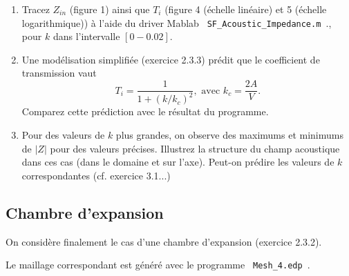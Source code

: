 \documentclass[11pt,a4paper]{article}
\begin{document}
\begin{enumerate}
\item 
Tracez $Z_{in}$ (figure 1) ainsi que $T_i$ (figure 4 (échelle linéaire) et 5 (échelle logarithmique))  à l'aide du driver Mablab 
\verb| SF_Acoustic_Impedance.m |., pour $k$ dans l'intervalle $[0-0.02]$.

\item Une modélisation simplifiée (exercice 2.3.3) prédit que le coefficient de transmission vaut 
$$
T_i  = \frac{1}{1+(k/k_c)^2}, \mbox{ avec } k_c = \frac{2 A}{V}.
$$
Comparez cette prédiction avec le résultat du programme.

\item Pour des valeurs de $k$ plus grandes, on observe des maximums et minimums de $|Z|$ pour des valeurs précises. Illustrez la structure du champ acoustique dans ces cas (dans le domaine et sur l'axe). Peut-on prédire les valeurs de $k$ correspondantes (cf. exercice 3.1...)






\end{enumerate}



\subsection{Chambre d'expansion}

On considère finalement le cas d'une chambre d'expansion (exercice 2.3.2).

Le maillage correspondant est généré avec le programme \verb| Mesh_4.edp |.
\end{document}
